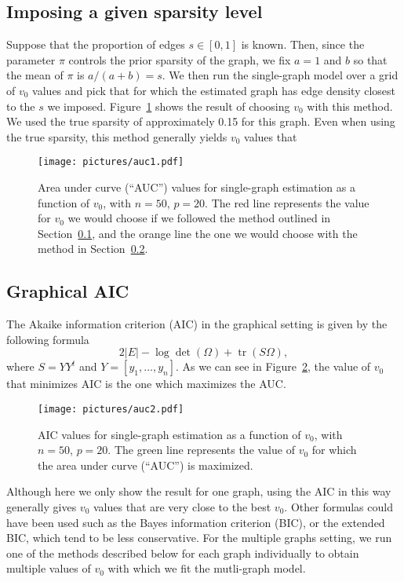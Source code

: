 \documentclass[a4paper, 11pt, oneside]{report}
\DeclareMathOperator{\tr}{tr}
\newcommand{\1}{\mathds{1}}
\begin{document}
\subsection{Imposing a given sparsity level}\label{sect:imposing-sparsity}
Suppose that the proportion of edges $s \in [0,1]$ is known.
Then, since the parameter $\pi$ controls the prior sparsity of the graph, we
fix $a = 1$ and $b$ so that the mean of $\pi$ is $a / (a+b) = s$.
We then run the single-graph model over a grid of $v_0$ values and pick that
for which the estimated graph has edge density closest to the $s$ we imposed.
Figure~\ref{fig:auc} shows the result of choosing $v_0$ with this method.
We used the true sparsity of approximately 0.15 for this graph.
Even when using the true sparsity, this method generally yields $v_0$ values
that
\begin{figure}[tb]
	\begin{center}
		\texttt{[image: pictures/auc1.pdf]}
	\end{center}
	\caption{Area under curve (``AUC'') values for single-graph estimation as a function of $v_0$, with $n=50$, $p=20$.
		The red line represents the value for $v_0$ we would choose if we followed the method outlined in Section~\ref{sect:imposing-sparsity},
		and the orange line the one we would choose with the method in Section~\ref{sect:graphical-aic}.
	}
	\label{fig:auc}
\end{figure}

\subsection{Graphical AIC}\label{sect:graphical-aic}
The Akaike information criterion (AIC) in the graphical setting is given by the following formula
\[2|E| - \log\det(\Omega) + \tr(S \Omega),\]
where $S = YY^t$ and $Y = [y_1, \dots, y_n]$.
As we can see in Figure~\ref{fig:aic}, the value of $v_0$ that minimizes AIC is the one which maximizes the AUC.
\begin{figure}[ht]
	\begin{center}
		\texttt{[image: pictures/auc2.pdf]}
	\end{center}
	\caption{AIC values for single-graph estimation as a function of $v_0$, with $n=50$, $p=20$.
		The green line represents the value of $v_0$ for which the area under curve (``AUC'') is maximized.
	}
	\label{fig:aic}
\end{figure}
Although here we only show the result for one graph, using the AIC in this way generally gives
$v_0$ values that are very close to the best $v_0$.
Other formulas could have been used such as the Bayes information criterion (BIC), or the
extended BIC, which tend to be less conservative.
For the multiple graphs setting, we run one of the methods described below for each graph individually
to obtain multiple values of $v_0$ with which we fit the mutli-graph model.
\end{document}
